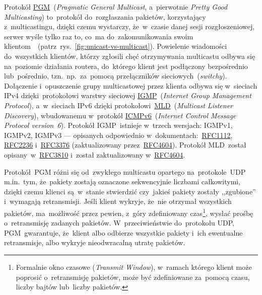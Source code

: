 \documentclass[thesis]{subfiles}
\begin{document}
Protokół \href{https://tools.ietf.org/html/rfc3208}{PGM}~(\emph{Pragmatic General Multicast}, a~pierwotnie \emph{Pretty Good Multicasting}) to~protokół do~rozgłaszania pakietów, korzystający z~multicastingu, dzięki czemu wystarczy, że~w~czasie danej sesji rozgłoszeniowej, serwer wyśle tylko raz to, co~ma do~zakomunikowania swoim klientom~\cite{pgm-rfc}~(patrz~rys.~\ref{fig:unicast-vs-multicast}). Powielenie wiadomości do~wszystkich klientów, którzy zgłosili chęć otrzymywania multicastu odbywa się na~poziomie działania routera, do~którego klient jest podłączony bezpośrednio lub~pośrednio, tzn.~np.~za~pomocą przełączników sieciowych~(\emph{switchy}). Dołączenie i~opuszczenie grupy multicastowej przez klienta odbywa się w~sieciach IPv4 dzięki~protokołowi warstwy sieciowej \href{https://en.wikipedia.org/wiki/Internet_Group_Management_Protocol}{IGMP}~(\emph{Internet Group Management Protocol}), a~w~sieciach IPv6 dzięki protokołowi~\href{https://en.wikipedia.org/wiki/Multicast_Listener_Discovery}{MLD}~(\emph{Multicast Listener Discovery}), wbudowanemu w~protokół \href{https://en.wikipedia.org/wiki/Internet_Control_Message_Protocol_version_6}{ICMPv6}~(\emph{Internet Control Message Protocol version~6}). Protokół IGMP~istnieje w~trzech wersjach: IGMPv1, IGMPv2, IGMPv3 --- opisanych odpowiednio w~dokumentach:~\href{https://tools.ietf.org/html/rfc1112}{RFC1112}, \href{https://tools.ietf.org/html/rfc2236}{RFC2236} i~\href{https://tools.ietf.org/html/rfc3376}{RFC3376} (zaktualizowany przez~\href{https://tools.ietf.org/html/rfc4604}{RFC4604}). Protokół MLD~został opisany~w~\href{https://tools.ietf.org/html/rfc3810}{RFC3810} i~został zaktualizowany w~\href{https://tools.ietf.org/html/rfc4604}{RFC4604}.

Protokół~PGM różni się od~zwykłego multicastu opartego na~protokole~UDP m.in.~tym, że~pakiety zostają oznaczone sekwencyjnie liczbami całkowitymi, dzięki czemu klienci są~w~stanie stwierdzić czy~jakieś pakiety zostały ,,zgubione'' i~wymagają retransmisji. Jeśli klient wykryje, że~nie otrzymał wszystkich pakietów, ma~możliwość przez pewien, z~góry zdefiniowany czas\footnote{Formalnie okno czasowe (\emph{Transmit Window}), w~ramach którego klient może poprosić o~retransmisję pakietów, może być zdefiniowane za~pomocą czasu, liczby bajtów lub~liczby pakietów.}, wysłać prośbę o~retransmisję zadanych pakietów. W~przeciwieństwie do~protokołu UDP, PGM~gwarantuje, że~klient albo odbierze wszystkie pakiety i~ich ewentualne retransmisje, albo wykryje nieodwracalną utratę pakietów.
\end{document}

